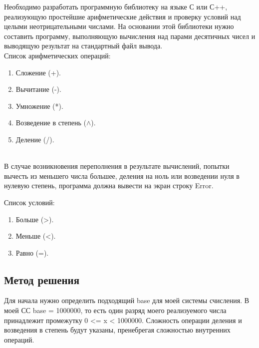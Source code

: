 \documentclass[12pt]{article}
\begin{document}
Необходимо разработать программную библиотеку на языке С или С++, реализующую простейшие арифметические действия и проверку условий над целыми неотрицательными числами. На основании этой библиотеки нужно составить программу, выполняющую вычисления над парами десятичных чисел и выводящую результат на стандартный файл вывода.\\
Список арифметических операций:
\begin{enumerate}
    \item Сложение (+).
    \item Вычитание (-).
    \item Умножение (*).
    \item Возведение в степень ($\wedge$).
    \item Деление (/).
\end{enumerate}
\\
В случае возникновения переполнения в результате вычислений, попытки вычесть из меньшего числа большее, деления на ноль или возведении нуля в нулевую степень, программа должна вывести на экран строку Error.

Список условий:
\begin{enumerate}
    \item Больше (>).
    \item Меньше (<).
    \item Равно (=).
\end{enumerate}

\subsection*{Метод решения}

Для начала нужно определить подходящий base для моей системы счисления. В моей СС base = 1000000, то есть один разряд моего реализуемого числа принадлежит промежутку 0 <= x < 1000000. Сложность операции деления и возведения в степень будут указаны, пренебрегая сложностью внутренних операций.
\end{document}
